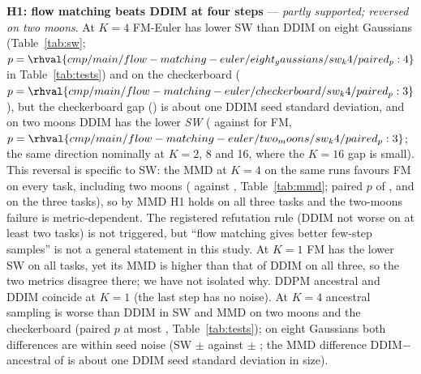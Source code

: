 \textbf{H1: flow matching beats DDIM at four steps} --- \emph{partly supported; reversed on two moons}. At $K{=}4$ FM-Euler has lower SW than DDIM on eight Gaussians (Table~\ref{tab:sw}; $p=\rhval{cmp/main/flow-matching-euler/eight_gaussians/sw_k4/paired_p:4}$ in Table~\ref{tab:tests}) and on the checkerboard ($p=\rhval{cmp/main/flow-matching-euler/checkerboard/sw_k4/paired_p:3}$), but the checkerboard gap () is about one DDIM seed standard deviation, and on two moons DDIM has the lower \emph{SW} ( against  for FM, $p=\rhval{cmp/main/flow-matching-euler/two_moons/sw_k4/paired_p:3}$; the same direction nominally at $K{=}2$, 8 and 16, where the $K{=}16$ gap is small). This reversal is specific to SW: the MMD at $K{=}4$ on the same runs favours FM on every task, including two moons ( against , Table~\ref{tab:mmd}; paired $p$ of ,  and  on the three tasks), so by MMD H1 holds on all three tasks and the two-moons failure is metric-dependent. The registered refutation rule (DDIM not worse on at least two tasks) is not triggered, but ``flow matching gives better few-step samples'' is not a general statement in this study. At $K{=}1$ FM has the lower SW on all tasks, yet its MMD is higher than that of DDIM on all three, so the two metrics disagree there; we have not isolated why. DDPM ancestral and DDIM coincide at $K{=}1$ (the last step has no noise). At $K{=}4$ ancestral sampling is worse than DDIM in SW and MMD on two moons and the checkerboard (paired $p$ at most , Table~\ref{tab:tests}); on eight Gaussians both differences are within seed noise (SW  $\pm$  against  $\pm$ ; the MMD difference DDIM$-$ancestral of  is about one DDIM seed standard deviation in size).

